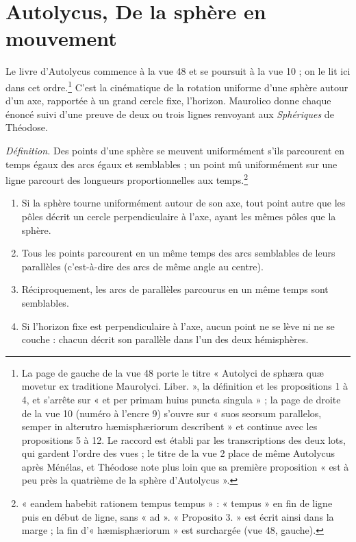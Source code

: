 \documentclass[11pt,a4paper]{article}
\begin{document}
\section*{Autolycus, De la sphère en mouvement}

Le livre d'Autolycus commence à la vue 48 et se poursuit à la vue 10 ; on le
lit ici dans cet ordre.\footnote{La page de gauche de la vue 48 porte le titre
« Autolyci de sphæra quæ movetur ex traditione Maurolyci. Liber. », la
définition et les propositions 1 à 4, et s'arrête sur « et per primam huius
puncta singula » ; la page de droite de la vue 10 (numéro à l'encre 9) s'ouvre
sur « suos seorsum parallelos, semper in alterutro hæmisphæriorum describent »
et continue avec les propositions 5 à 12. Le raccord est établi par les
transcriptions des deux lots, qui gardent l'ordre des vues ; le titre de la
vue 2 place de même Autolycus après Ménélas, et Théodose note plus loin que sa
première proposition « est à peu près la quatrième de la sphère
d'Autolycus ».} C'est la cinématique de la rotation uniforme d'une sphère
autour d'un axe, rapportée à un grand cercle fixe, l'horizon. Maurolico donne
chaque énoncé suivi d'une preuve de deux ou trois lignes renvoyant aux
\emph{Sphériques} de Théodose.

\emph{Définition.} Des points d'une sphère se meuvent uniformément s'ils
parcourent en temps égaux des arcs égaux et semblables ; un point mû
uniformément sur une ligne parcourt des longueurs proportionnelles aux
temps.\footnote{« eandem habebit rationem tempus tempus » : « tempus » en fin de
ligne puis en début de ligne, sans « ad ». « Proposito 3. » est écrit ainsi
dans la marge ; la fin d'« hæmisphæriorum » est surchargée (vue 48, gauche).}

\begin{enumerate}
  \item[1.] Si la sphère tourne uniformément autour de son axe, tout point
    autre que les pôles décrit un cercle perpendiculaire à l'axe, ayant les
    mêmes pôles que la sphère.
  \item[2.] Tous les points parcourent en un même temps des arcs semblables de
    leurs parallèles (c'est-à-dire des arcs de même angle au centre).
  \item[3.] Réciproquement, les arcs de parallèles parcourus en un même temps
    sont semblables.
  \item[4.] Si l'horizon fixe est perpendiculaire à l'axe, aucun point ne se
    lève ni ne se couche : chacun décrit son parallèle dans l'un des deux
    hémisphères.
\end{enumerate}
\end{document}
